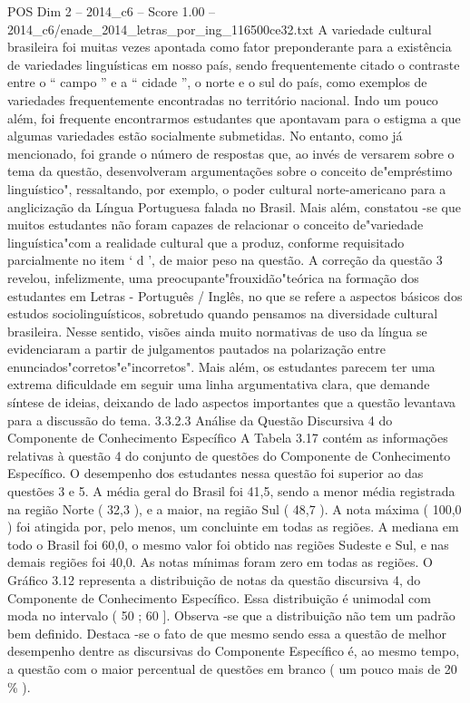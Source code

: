 \begin{textsample}{POS Dim 2 – 2014\_c6 – Score 1.00 – 2014\_c6/enade\_2014\_letras\_por\_ing\_116500ce32.txt}
A variedade cultural brasileira foi muitas vezes apontada como fator preponderante para a existência de variedades linguísticas em nosso país, sendo frequentemente citado o contraste entre o “ campo ” e a “ cidade ”, o norte e o sul do país, como exemplos de variedades frequentemente encontradas no território nacional.
Indo um pouco além, foi frequente encontrarmos estudantes que apontavam para o estigma a que algumas variedades estão socialmente submetidas.
No entanto, como já mencionado, foi grande o número de respostas que, ao invés de versarem sobre o tema da questão, desenvolveram argumentações sobre o conceito de"empréstimo linguístico", ressaltando, por exemplo, o poder cultural norte-americano para a anglicização da Língua Portuguesa falada no Brasil.
Mais além, constatou -se que muitos estudantes não foram capazes de relacionar o conceito de"variedade linguística"com a realidade cultural que a produz, conforme requisitado parcialmente no item ‘ d ’, de maior peso na questão.
A correção da questão 3 revelou, infelizmente, uma preocupante"frouxidão"teórica na formação dos estudantes em Letras - Português / Inglês, no que se refere a aspectos básicos dos estudos sociolinguísticos, sobretudo quando pensamos na diversidade cultural brasileira.
Nesse sentido, visões ainda muito normativas de uso da língua se evidenciaram a partir de julgamentos pautados na polarização entre enunciados"corretos"e"incorretos".
Mais além, os estudantes parecem ter uma extrema dificuldade em seguir uma linha argumentativa clara, que demande síntese de ideias, deixando de lado aspectos importantes que a questão levantava para a discussão do tema. 3.3.2.3 Análise da Questão Discursiva 4 do Componente de Conhecimento Específico A Tabela 3.17 contém as informações relativas à questão 4 do conjunto de questões do Componente de Conhecimento Específico.
O desempenho dos estudantes nessa questão foi superior ao das questões 3 e 5.
A média geral do Brasil foi 41,5, sendo a menor média registrada na região Norte ( 32,3 ), e a maior, na região Sul ( 48,7 ).
A nota máxima ( 100,0 ) foi atingida por, pelo menos, um concluinte em todas as regiões.
A mediana em todo o Brasil foi 60,0, o mesmo valor foi obtido nas regiões Sudeste e Sul, e nas demais regiões foi 40,0.
As notas mínimas foram zero em todas as regiões.
O Gráfico 3.12 representa a distribuição de notas da questão discursiva 4, do Componente de Conhecimento Específico.
Essa distribuição é unimodal com moda no intervalo ( 50 ; 60 ].
Observa -se que a distribuição não tem um padrão bem definido.
Destaca -se o fato de que mesmo sendo essa a questão de melhor desempenho dentre as discursivas do Componente Específico é, ao mesmo tempo, a questão com o maior percentual de questões em branco ( um pouco mais de 20 \% ).

\end{textsample}
